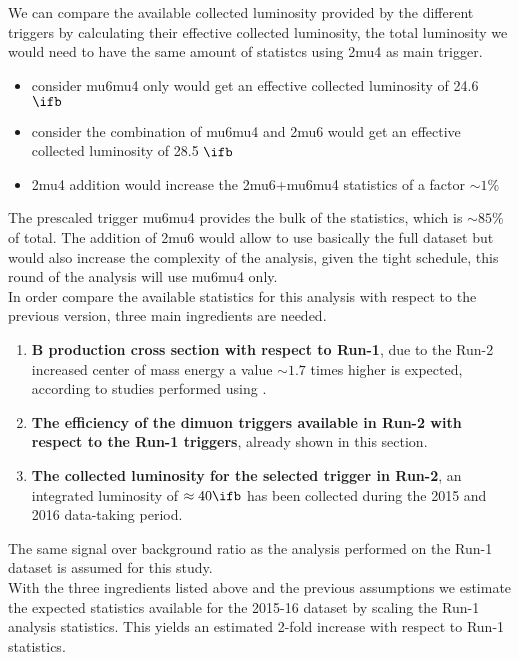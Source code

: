 We can compare the available collected luminosity provided by the different triggers by calculating their effective collected luminosity, the total luminosity we would need to have the same amount of statistcs using 2mu4 as main trigger.
\begin{itemize}
\item consider mu6mu4 only would get an effective collected luminosity of 24.6 $\ifb$
\item consider the combination of mu6mu4 and 2mu6 would get an effective collected luminosity of 28.5 $\ifb$
\item 2mu4 addition would increase the 2mu6+mu6mu4 statistics of a factor $\sim 1 \%$
\end{itemize}
The prescaled trigger mu6mu4 provides the bulk of the statistics, which is $\sim 85 \%$ of total. The addition of 2mu6 would allow to use basically the full dataset but would also increase the complexity of the analysis, given the tight schedule, this round of the analysis will use mu6mu4 only.
\\


In order compare the available statistics for this analysis with respect to the previous version, 
three main ingredients are needed.
\begin{enumerate}
\item \textbf{B production cross section with respect to Run-1}, due to the Run-2 
increased center of mass energy a value $\sim 1.7$ times higher is expected, 
according to studies performed using . %
\item \textbf{The efficiency of the dimuon triggers available in Run-2 with respect to the Run-1 triggers},  
already shown in this section.
\item \textbf{The collected luminosity for the selected trigger in Run-2}, an integrated luminosity 
of $\approx 40\ifb$ has been collected during the 2015 and 2016 data-taking period.
\end{enumerate}
The same signal over background ratio as the analysis performed on the Run-1 dataset is assumed for this study.\\
With the three ingredients listed above and the previous assumptions we estimate the expected 
statistics available for the 2015-16 dataset by scaling the Run-1 analysis 
statistics. This yields an estimated 2-fold increase with respect to Run-1 statistics.




\clearpage
